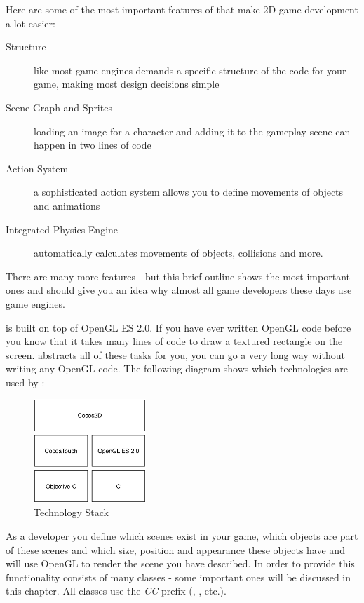 Here are some of the most important features of \cocos{} that make 2D game
development a lot easier:
\begin{description}
  \item[Structure] like most game engines \cocos{} demands a specific structure
  of the code for your game, making most design decisions simple
  \item[Scene Graph and Sprites] loading an image for a character and adding it
  to the gameplay scene can happen in two lines of code
  \item[Action System] a sophisticated action system allows you to define
  movements of objects and animations
  \item[Integrated Physics Engine] automatically calculates movements of
  objects, collisions and more.
\end{description}
There are many more features - but this brief outline shows the most
important ones and should give you an idea why almost all game developers these
days use game engines. 

\cocos{} is built on top of OpenGL ES 2.0. If you have ever written OpenGL code
before you know that it takes many lines of code to draw a textured rectangle on
the screen. \cocos{} abstracts all of these tasks for you, you can go a very
long way without writing any OpenGL code. The following diagram shows which
technologies are used by \cocos{}:

\begin{figure}[H]
		\centering
		\includegraphics[width=120pt]{images/cocos2d/TechnologyStack.png}     
		\caption{\cocos{} Technology Stack}
\end{figure}

As a \cocos{} developer you define which scenes exist in your game, which
objects are part of these scenes and which size, position and appearance these
objects have and \cocos{} will use OpenGL to render the scene you have
described. In order to provide this functionality \cocos{} consists of many
classes - some important ones will be discussed in this chapter. All \cocos{}
classes use the \textit{CC} prefix (\ccscene{}, \ccnode{}, etc.).

